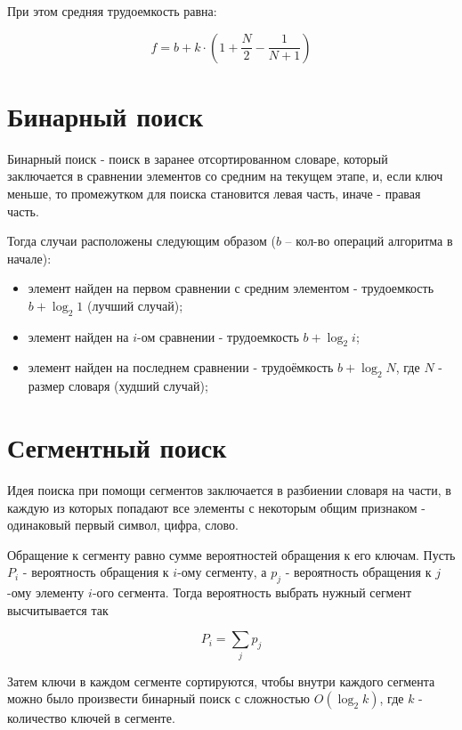 При этом средняя трудоемкость равна:

\begin{equation}
	f = b + k \cdot \left(1 + \frac{N}{2} - \frac{1}{N + 1}\right)
\end{equation}

\section{Бинарный поиск}

Бинарный поиск \cite{search-bin} - поиск в заранее отсортированном словаре, который заключается в сравнении элементов со средним на текущем этапе, и, если ключ меньше, то промежутком для поиска становится левая часть, иначе - правая часть.

Тогда случаи расположены следующим образом ($b$ -- кол-во операций алгоритма в начале):
\begin{itemize}
	\item элемент найден на первом сравнении с средним элементом - трудоемкость $b + \log_2 1$ (лучший случай);
	\item элемент найден на $i$-ом сравнении - трудоемкость $b + \log_2 i$;
	\item элемент найден на последнем сравнении - трудоёмкость $b +  \log_2 N$, где $N$ - размер словаря (худший случай);
\end{itemize}

\section{Сегментный поиск}

Идея поиска при помощи сегментов \cite{search-segments} заключается в разбиении словаря на части, в каждую из которых попадают все элементы с некоторым общим признаком - одинаковый первый символ, цифра, слово.

Обращение к сегменту равно сумме вероятностей обращения к его ключам. Пусть $P_i$ - вероятность обращения к $i$-ому сегменту, а $p_j$ - вероятность обращения к $j$-ому элементу $i$-ого сегмента. Тогда вероятность выбрать нужный сегмент высчитывается так 

\begin{equation}
	P_i = \sum_j p_j
\end{equation}

Затем ключи в каждом сегменте сортируются, чтобы внутри каждого сегмента можно было произвести бинарный поиск с сложностью $O(\log_2 k)$, где $k$ - количество ключей в сегменте.

